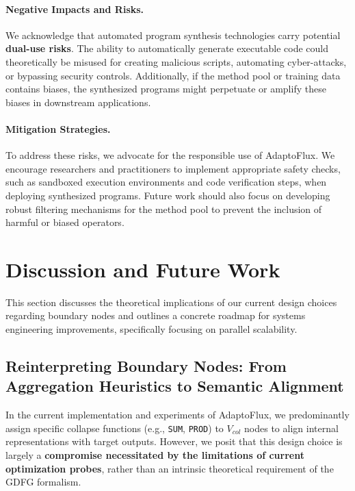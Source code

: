 \paragraph{Negative Impacts and Risks.}
We acknowledge that automated program synthesis technologies carry potential \textbf{dual-use risks}. The ability to automatically generate executable code could theoretically be misused for creating malicious scripts, automating cyber-attacks, or bypassing security controls. Additionally, if the method pool or training data contains biases, the synthesized programs might perpetuate or amplify these biases in downstream applications.

\paragraph{Mitigation Strategies.}
To address these risks, we advocate for the responsible use of AdaptoFlux. We encourage researchers and practitioners to implement appropriate safety checks, such as sandboxed execution environments and code verification steps, when deploying synthesized programs. Future work should also focus on developing robust filtering mechanisms for the method pool to prevent the inclusion of harmful or biased operators.

\section{Discussion and Future Work}
\label{app:discussion_future_work}

This section discusses the theoretical implications of our current design choices regarding boundary nodes and outlines a concrete roadmap for systems engineering improvements, specifically focusing on parallel scalability.

\subsection{Reinterpreting Boundary Nodes: From Aggregation Heuristics to Semantic Alignment}
\label{subsec:rethinking_collapse}

In the current implementation and experiments of AdaptoFlux, we predominantly assign specific collapse functions (e.g., \texttt{SUM}, \texttt{PROD}) to $V_{col}$ nodes to align internal representations with target outputs. However, we posit that this design choice is largely a \textbf{compromise necessitated by the limitations of current optimization probes}, rather than an intrinsic theoretical requirement of the GDFG formalism.

